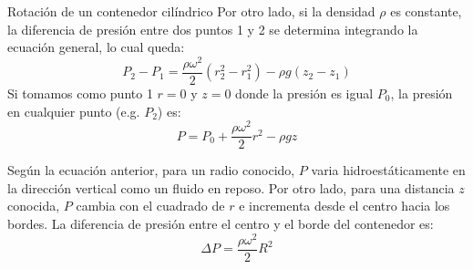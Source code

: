 \documentclass [xcolor=svgnames, t] {beamer}
\begin{document}
\begin{frame}{Rotaci\'on de un contenedor cil\'indrico}
\vspace{-0.4cm}
\footnotesize
Por otro lado, si la densidad $\rho$ es constante, la diferencia de presi\'on entre dos puntos 1 y 2 se determina integrando la ecuaci\'on general, lo cual queda:
$$
P_2 - P_1 = \frac{\rho \omega^2}{2}(r_2^2 - r_1^2 ) - \rho g (z_2 - z_1)
$$
Si tomamos como punto 1 $r=0$ y $z=0$ donde la presi\'on es igual $P_0$, la presi\'on en cualquier punto (e.g. $P_2$) es:
$$
P = P_0 + \frac{\rho \omega^2}{2} r^2 - \rho g z 
$$

Seg\'un la ecuaci\'on anterior, para un radio conocido, $P$ varia hidroest\'aticamente en la direcci\'on vertical como un fluido en reposo. Por otro lado, para una distancia $z$ conocida, $P$ cambia con el cuadrado de $r$ e incrementa desde el centro hacia los bordes. La diferencia de presi\'on entre el centro y el borde del contenedor es:
$$
\Delta P = \frac{\rho \omega^2}{2} R^2 
$$
\end{frame}
\end{document}
